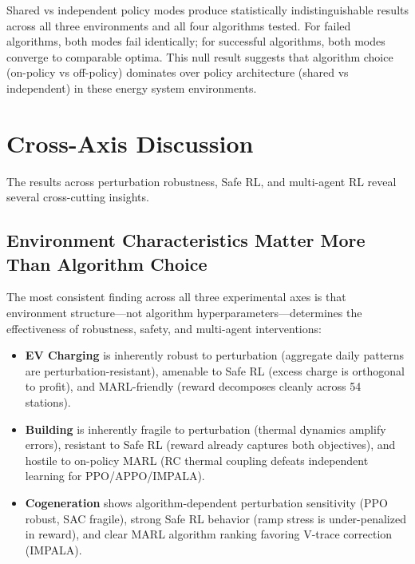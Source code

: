 \begin{finding}
Shared vs independent policy modes produce statistically indistinguishable results across all three environments and all four algorithms tested. For failed algorithms, both modes fail identically; for successful algorithms, both modes converge to comparable optima. This null result suggests that algorithm choice (on-policy vs off-policy) dominates over policy architecture (shared vs independent) in these energy system environments.
\end{finding}

\section{Cross-Axis Discussion}
\label{sec:results_discussion}

The results across perturbation robustness, Safe RL, and multi-agent RL reveal several cross-cutting insights.

\subsection{Environment Characteristics Matter More Than Algorithm Choice}

The most consistent finding across all three experimental axes is that environment structure---not algorithm hyperparameters---determines the effectiveness of robustness, safety, and multi-agent interventions:

\begin{itemize}
    \item \textbf{EV Charging} is inherently robust to perturbation (aggregate daily patterns are perturbation-resistant), amenable to Safe RL (excess charge is orthogonal to profit), and MARL-friendly (reward decomposes cleanly across 54 stations).
    \item \textbf{Building} is inherently fragile to perturbation (thermal dynamics amplify errors), resistant to Safe RL (reward already captures both objectives), and hostile to on-policy MARL (RC thermal coupling defeats independent learning for PPO/APPO/IMPALA).
    \item \textbf{Cogeneration} shows algorithm-dependent perturbation sensitivity (PPO robust, SAC fragile), strong Safe RL behavior (ramp stress is under-penalized in reward), and clear MARL algorithm ranking favoring V-trace correction (IMPALA).
\end{itemize}

